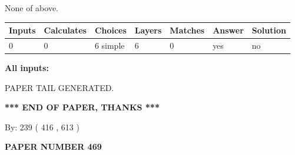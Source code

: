 \documentclass[12pt]{article}
\begin{document}
 
\noindent{}
 
 
 None of above.
 
 
\noindent{}
 
 
   
   
   
   
\noindent\begin{tabular}{|l|l|l|l|l|l|l|}
 \hline
Inputs & Calculates & Choices & Layers & Matches & Answer & Solution \\ \hline
 0  & 
 0  & 
 6
  simple  
  & 
 6  & 
 0  & 
  yes & 
  no 
  \\ \hline
 \end{tabular}
   
   
   
   
\noindent{}
   
   
   
   
\noindent\vspace{0.1in}\hspace{-0.08in} {\textbf{\Large{All inputs: }}}
   
   
   
   
   
   
 \vspace{0.2in}
 
   
   
\vspace{2.0in} PAPER TAIL GENERATED.
   
   
   
   
\vspace{1.0in} 
{\textbf{\large{ *** END OF PAPER, THANKS *** }}} 
   
   
\hspace{1.0in} By: 
 239 ( 416 ,  613 )
   
   
   
   
\newpage 
\setcounter{page}{ 
   469001 } 
   
   
   
   
 {\textbf{ \Large{ PAPER NUMBER  469  }}}
   
   
\vspace{0.2in}
   
   
   
\end{document}
